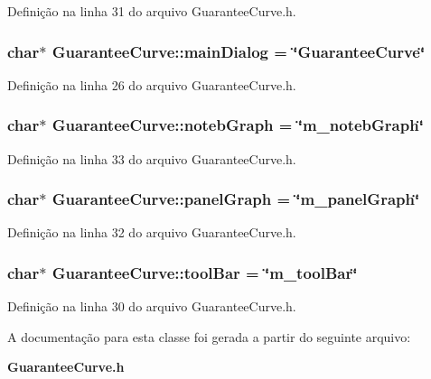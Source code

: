 Definição na linha 31 do arquivo Guarantee\+Curve.\+h.

\subsubsection[{main\+Dialog}]{\setlength{\rightskip}{0pt plus 5cm}char$\ast$ Guarantee\+Curve\+::main\+Dialog = \char`\"{}Guarantee\+Curve\char`\"{}\hspace{0.3cm}{\ttfamily [protected]}}\label{class_guarantee_curve_a8230e1de4141ef2d34dac8c56e509dd9}


Definição na linha 26 do arquivo Guarantee\+Curve.\+h.

\subsubsection[{noteb\+Graph}]{\setlength{\rightskip}{0pt plus 5cm}char$\ast$ Guarantee\+Curve\+::noteb\+Graph = \char`\"{}m\+\_\+noteb\+Graph\char`\"{}\hspace{0.3cm}{\ttfamily [protected]}}\label{class_guarantee_curve_a6a482c7ce77e414c3be9d61cec0efb73}


Definição na linha 33 do arquivo Guarantee\+Curve.\+h.

\subsubsection[{panel\+Graph}]{\setlength{\rightskip}{0pt plus 5cm}char$\ast$ Guarantee\+Curve\+::panel\+Graph = \char`\"{}m\+\_\+panel\+Graph\char`\"{}\hspace{0.3cm}{\ttfamily [protected]}}\label{class_guarantee_curve_a4c9726b84ef79c94a8908d0db71dbd75}


Definição na linha 32 do arquivo Guarantee\+Curve.\+h.

\subsubsection[{tool\+Bar}]{\setlength{\rightskip}{0pt plus 5cm}char$\ast$ Guarantee\+Curve\+::tool\+Bar = \char`\"{}m\+\_\+tool\+Bar\char`\"{}\hspace{0.3cm}{\ttfamily [protected]}}\label{class_guarantee_curve_a9d6c8ef07d8da385c335a3185f2889af}


Definição na linha 30 do arquivo Guarantee\+Curve.\+h.



A documentação para esta classe foi gerada a partir do seguinte arquivo\+:\begin{DoxyCompactItemize}
\item 
{\bf Guarantee\+Curve.\+h}\end{DoxyCompactItemize}
